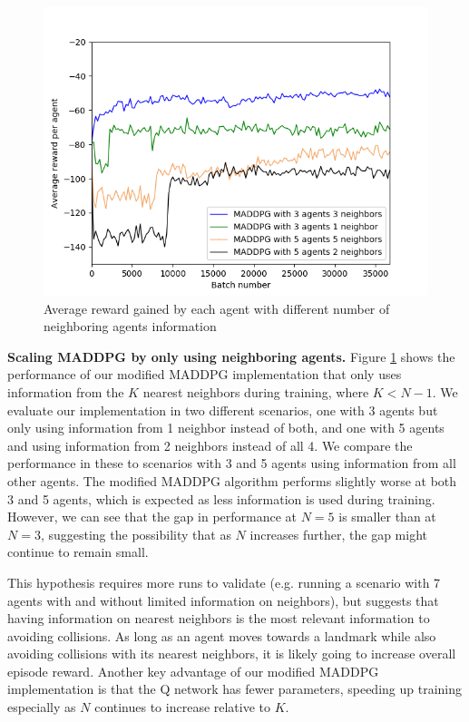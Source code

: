 \documentclass{article}
\begin{document}
\begin{figure}
\begin{center}
\includegraphics[scale=0.5]{MADDPG_different_neighbors.png}
\end{center}
\caption{Average reward gained by each agent with different number of neighboring agents information}
\label{fig:avg_reward_different_neighbors}
\end{figure}


\textbf{Scaling MADDPG by only using neighboring agents.} Figure \ref{fig:avg_reward_different_neighbors} shows the performance of our modified MADDPG implementation that only uses information from the $K$ nearest neighbors during training, where $K < N-1$. We evaluate our implementation in two different scenarios, one with 3 agents but only using information from 1 neighbor instead of both, and one with 5 agents and using information from 2 neighbors instead of all 4. We compare the performance in these to scenarios with 3 and 5 agents using information from all other agents. The modified MADDPG algorithm performs slightly worse at both 3 and 5 agents, which is expected as less information is used during training. However, we can see that the gap in performance at $N=5$ is smaller than at $N=3$, suggesting the possibility that as $N$ increases further, the gap might continue to remain small.

This hypothesis requires more runs to validate (e.g. running a scenario with 7 agents with and without limited information on neighbors), but suggests that having information on nearest neighbors is the most relevant information to avoiding collisions. As long as an agent moves towards a landmark while also avoiding collisions with its nearest neighbors, it is likely going to increase overall episode reward. Another key advantage of our modified MADDPG implementation is that the Q network has fewer parameters, speeding up training especially as $N$ continues to increase relative to $K$.
\end{document}
